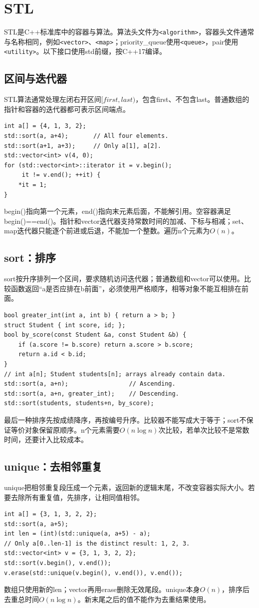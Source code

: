 \section{STL}
STL是C++标准库中的容器与算法。算法头文件为\texttt{<algorithm>}，容器头文件通常与名称相同，例如\texttt{<vector>}、\texttt{<map>}；priority\_queue使用\texttt{<queue>}，pair使用\texttt{<utility>}。以下接口使用std前缀，按C++17编译。

\subsection{区间与迭代器}
STL算法通常处理左闭右开区间$[first,last)$，包含first、不包含last。普通数组的指针和容器的迭代器都可表示区间端点。
\begin{lstlisting}
int a[] = {4, 1, 3, 2};
std::sort(a, a+4);       // All four elements.
std::sort(a+1, a+3);     // Only a[1], a[2].
std::vector<int> v(4, 0);
for (std::vector<int>::iterator it = v.begin();
     it != v.end(); ++it) {
    *it = 1;
}
\end{lstlisting}
begin()指向第一个元素，end()指向末元素后面，不能解引用。空容器满足begin()==end()。指针和vector迭代器支持常数时间的加减、下标与相减；set、map迭代器只能逐个前进或后退，不能加一个整数。遍历n个元素为$O(n)$。

\subsection{sort：排序}
sort按升序排列一个区间，要求随机访问迭代器；普通数组和vector可以使用。比较函数返回“a是否应排在b前面”，必须使用严格顺序，相等对象不能互相排在前面。
\begin{lstlisting}
bool greater_int(int a, int b) { return a > b; }
struct Student { int score, id; };
bool by_score(const Student &a, const Student &b) {
    if (a.score != b.score) return a.score > b.score;
    return a.id < b.id;
}
// int a[n]; Student students[n]; arrays already contain data.
std::sort(a, a+n);                 // Ascending.
std::sort(a, a+n, greater_int);    // Descending.
std::sort(students, students+n, by_score);
\end{lstlisting}
最后一种排序先按成绩降序，再按编号升序。比较器不能写成大于等于；sort不保证等价对象保留原顺序。n个元素需要$O(n\log n)$次比较，若单次比较不是常数时间，还要计入比较成本。

\subsection{unique：去相邻重复}
unique把相邻重复段压成一个元素，返回新的逻辑末尾，不改变容器实际大小。若要去除所有重复值，先排序，让相同值相邻。
\begin{lstlisting}
int a[] = {3, 1, 3, 2, 2};
std::sort(a, a+5);
int len = (int)(std::unique(a, a+5) - a);
// Only a[0..len-1] is the distinct result: 1, 2, 3.
std::vector<int> v = {3, 1, 3, 2, 2};
std::sort(v.begin(), v.end());
v.erase(std::unique(v.begin(), v.end()), v.end());
\end{lstlisting}
数组只使用新的len；vector再用erase删除无效尾段。unique本身$O(n)$，排序后去重总时间$O(n\log n)$。新末尾之后的值不能作为去重结果使用。

